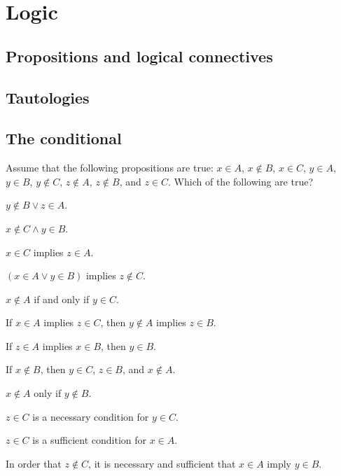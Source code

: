 \chapter{Logic}
\section{Propositions and logical connectives}
\section{Tautologies}
\section{The conditional}
\begin{exercise}
Assume that the following propositions are true: $x\in A$, $x\nin B$, $x\in C$, $y\in A$,
$y\in B$, $y\nin C$, $z\nin A$, $z\nin B$, and $z\in C$. Which of the following are true?
\begin{enumalpha}
    \item $y\nin B\lor z\in A$.
    \item $x\nin C\land y\in B$.
    \item $x\in C$ implies $z\in A$.
    \item $(x\in A\lor y\in B)$ implies $z\nin C$.
    \item $x\nin A$ if and only if $y\in C$.
    \item If $x\in A$ implies $z\in C$, then $y\nin A$ implies $z\in B$.
    \item If $z\in A$ implies $x\in B$, then $y\in B$.
    \item If $x\nin B$, then $y\in C$, $z\in B$, and $x\nin A$.
    \item $x\nin A$ only if $y\nin B$.
    \item $z\in C$ is a necessary condition for $y\in C$.
    \item $z\in C$ is a sufficient condition for $x\in A$.
    \item In order that $z\nin C$, it is necessary and sufficient that $x\in A$ imply $y\in B$.
\end{enumalpha}
\end{exercise}

